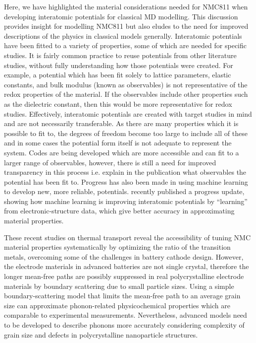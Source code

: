 \documentclass[journal=jacsat,manuscript=article]{achemso}
\begin{document}
Here, we have highlighted the material considerations needed for NMC811 when developing interatomic potentials for classical MD modelling. This discussion provides insight for modelling NMC811 but also eludes to the need for improved descriptions of the physics in classical models generally. Interatomic potentials have been fitted to a variety of properties, some of which are needed for specific studies. It is fairly common practice to reuse potentials from other literature studies, without fully understanding how those potentials were created. For example, a potential which has been fit solely to lattice parameters, elastic constants, and bulk modulus (known as observables) is not representative of the redox properties of the material. If the observables include other properties such as the dielectric constant, then this would be more representative for redox studies. Effectively, interatomic potentials are created with target studies in mind and are not necessarily transferable. As there are many properties which it is possible to fit to, the degrees of freedom become too large to include all of these and in some cases the potential form itself is not adequate to represent the system. Codes are being developed which are more accessible and can fit to a larger range of observables, however, there is still a need for improved transparency in this process i.e. explain in the publication what observables the potential has been fit to. Progress has also been made in using machine learning to develop new, more reliable, potentials. \citeauthor{deringer2019machine} recently published a progress update, showing how machine learning is improving interatomic potentials by ``learning'' from electronic-structure data, which give better accuracy in approximating material properties. \cite{deringer2019machine}

These recent studies on thermal transport reveal the accessibility of tuning NMC material properties systematically by optimizing the ratio of the transition metals, overcoming some of the challenges in battery cathode design. However, the electrode materials in advanced batteries are not single crystal, therefore the longer mean-free paths are possibly suppressed in real polycrystalline electrode materials by boundary scattering due to small particle sizes. Using a simple boundary-scattering model that limits the mean-free path to an average grain size can approximate phonon-related physicochemical properties which are comparable to experimental measurements. Nevertheless, advanced models need to be developed to describe phonons more accurately considering complexity of grain size and defects in polycrystalline nanoparticle structures.  
\end{document}
